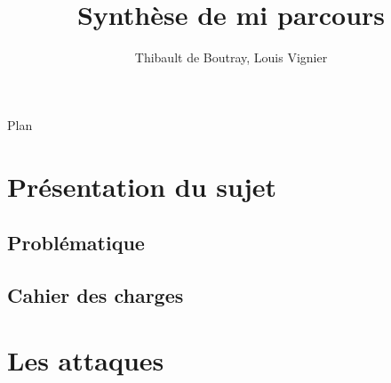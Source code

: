 \documentclass{beamer}
\title{Synthèse de mi parcours}
\author{Thibault de Boutray, Louis Vignier}
\institute{CentraleSupélec}
\begin{document}
\begin{frame}
  \titlepage
\end{frame}

\begin{frame}{Plan}
  \tableofcontents
\end{frame}

\section{Présentation du sujet}

\begin{frame}
    
\end{frame}

\subsection{Problématique}

\subsection{Cahier des charges}

\section{Les attaques}
\end{document}
